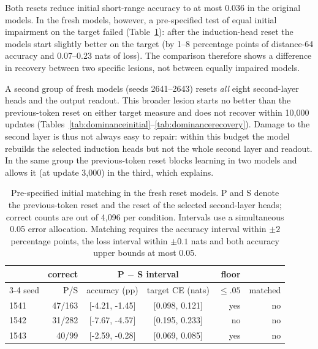Both resets reduce initial short-range accuracy to at most 0.036 in the original
models. In the fresh models, however, a pre-specified test of equal initial
impairment on the target failed (Table~\ref{tab:mfc_initial}): after the
induction-head reset the models start slightly better on the target (by 1--8
percentage points of distance-64 accuracy and 0.07--0.23 nats of loss). The
comparison therefore shows a difference in recovery between two specific lesions,
not between equally impaired models.

A second group of fresh models (seeds 2641--2643) resets \emph{all} eight second-layer heads
and the output readout. This broader lesion starts no better than the previous-token
reset on either target measure and does not recover within 10,000 updates
(Tables~\ref{tab:dominanceinitial}--\ref{tab:dominancerecovery}). Damage to the
second layer is thus not always easy to repair: within this budget the model
rebuilds the selected induction heads but not the whole second layer and readout.
In the same group the previous-token reset blocks learning in two models and allows
it (at update 3,000) in the third, which  explains.

\begin{table}[!htbp]
\centering\small
\caption{Pre-specified initial matching in the fresh reset models. P and S denote
the previous-token reset and the reset of the selected second-layer heads; correct
counts are out of 4,096 per condition. Intervals use a simultaneous 0.05 error
allocation. Matching requires the accuracy interval within $\pm2$ percentage points,
the loss interval within $\pm0.1$ nats and both accuracy upper bounds at most
0.05.}
\label{tab:mfc_initial}
\begin{tabular}{lrccrr}\toprule
 & correct & \multicolumn{2}{c}{P $-$ S interval} & floor & \\
\cmidrule(lr){3-4}
seed & P/S & accuracy (pp) & target CE (nats) & $\le .05$ & matched\\\midrule
1541 & 47/163 & [-4.21, -1.45] & [0.098, 0.121] & yes & no \\
1542 & 31/282 & [-7.67, -4.57] & [0.195, 0.233] & no & no \\
1543 & 40/99 & [-2.59, -0.28] & [0.069, 0.085] & yes & no \\
\bottomrule\end{tabular}
\end{table}

